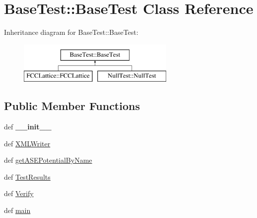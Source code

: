\hypertarget{classBaseTest_1_1BaseTest}{
\section{BaseTest::BaseTest Class Reference}
\label{classBaseTest_1_1BaseTest}
}
Inheritance diagram for BaseTest::BaseTest:\begin{figure}[H]
\begin{center}
\leavevmode
\includegraphics[height=2.000000cm]{classBaseTest_1_1BaseTest}
\end{center}
\end{figure}
\subsection*{Public Member Functions}
\begin{DoxyCompactItemize}
\item 
\hypertarget{classBaseTest_1_1BaseTest_a217c24e20c2abe8be4647faebac3e6ac}{
def {\bfseries \_\-\_\-init\_\-\_\-}}
\label{classBaseTest_1_1BaseTest_a217c24e20c2abe8be4647faebac3e6ac}

\item 
def \hyperlink{classBaseTest_1_1BaseTest_a1deedc89d1061da5e3afbd108af06760}{XMLWriter}
\item 
def \hyperlink{classBaseTest_1_1BaseTest_a69587478d3e6af59228e466411efb626}{getASEPotentialByName}
\item 
def \hyperlink{classBaseTest_1_1BaseTest_ad7b3f3b61fcb07c94ae62cb12f060819}{TestResults}
\item 
def \hyperlink{classBaseTest_1_1BaseTest_a1857df472a65cef53372455376136409}{Verify}
\item 
def \hyperlink{classBaseTest_1_1BaseTest_adace34a3904d856f00286217637b9914}{main}
\end{DoxyCompactItemize}
